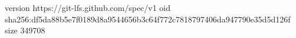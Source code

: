 version https://git-lfs.github.com/spec/v1
oid sha256:df5da88b5e7f0189d8a9544656b3c64f772c7818797406da947790e35d5d126f
size 349708
